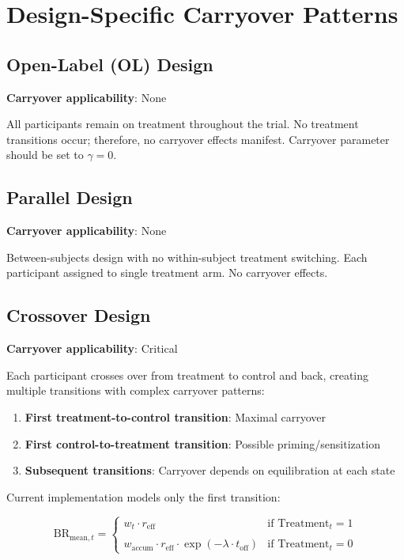 \documentclass[11pt,a4paper]{article}
\begin{document}
\section{Design-Specific Carryover Patterns}
\label{sec:design_specific}

\subsection{Open-Label (OL) Design}

\textbf{Carryover applicability}: None

All participants remain on treatment throughout the trial. No treatment transitions occur; therefore, no carryover effects manifest. Carryover parameter should be set to $\gamma = 0$.

\subsection{Parallel Design}

\textbf{Carryover applicability}: None

Between-subjects design with no within-subject treatment switching. Each participant assigned to single treatment arm. No carryover effects.

\subsection{Crossover Design}

\textbf{Carryover applicability}: Critical

Each participant crosses over from treatment to control and back, creating multiple transitions with complex carryover patterns:

\begin{enumerate}
  \item \textbf{First treatment-to-control transition}: Maximal carryover
  \item \textbf{First control-to-treatment transition}: Possible priming/sensitization
  \item \textbf{Subsequent transitions}: Carryover depends on equilibration at each state
\end{enumerate}

Current implementation models only the first transition:

\begin{equation}
  \text{BR}_{\text{mean},t} = \begin{cases}
    w_t \cdot r_{\text{eff}} & \text{if Treatment}_t = 1 \\
    \\
    w_{\text{accum}} \cdot r_{\text{eff}} \cdot \exp(-\lambda \cdot t_{\text{off}}) & \text{if Treatment}_t = 0
  \end{cases}
\end{equation}
\end{document}
